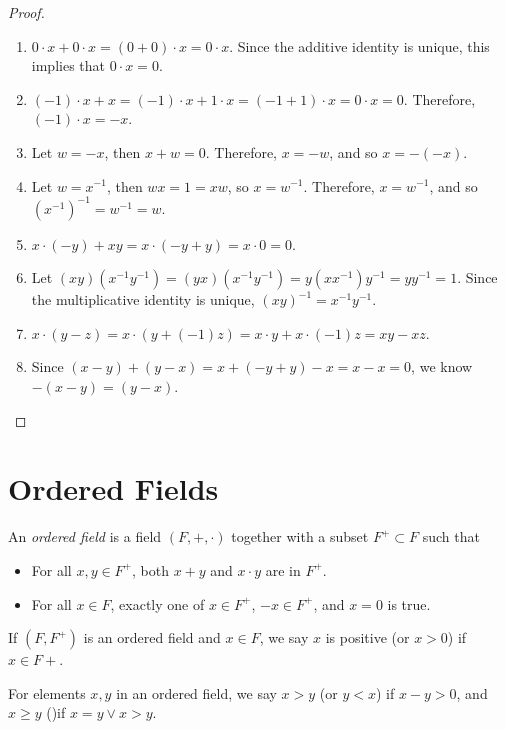 \documentclass[12pt]{article}
\begin{document}
\begin{proof}\proofbreak
    \begin{enumerate}
        \item $0 \cdot x + 0 \cdot x = (0 + 0) \cdot x = 0 \cdot x$. Since the additive identity is unique, this implies that $0 \cdot x = 0$.
        \item $(-1) \cdot x + x = (-1) \cdot x + 1 \cdot x = (-1 + 1) \cdot x = 0 \cdot x = 0$. Therefore, $(-1) \cdot x = -x$.
        \item Let $w = -x$, then $x + w = 0$. Therefore, $x = -w$, and so $x = -(-x)$.
        \item Let $w = x^{-1}$, then $wx = 1 = xw$, so $x = w^{-1}$. Therefore, $x = w^{-1}$, and so $(x^{-1})^{-1} = w^{-1} = w$.
        \item $x \cdot (-y) + xy = x\cdot(-y + y) = x\cdot 0 = 0$.
        \item Let $(xy)(x^{-1}y^{-1}) = (yx)(x^{-1}y^{-1}) = y(xx^{-1})y^{-1} = yy^{-1} = 1$. Since the multiplicative identity is unique, $(xy)^{-1} = x^{-1}y^{-1}$.
        \item $x \cdot (y-z) = x \cdot (y + (-1)z) = x\cdot y + x \cdot (-1)z = xy - xz$.
        \item Since $(x - y) + (y-x) = x + (-y + y) - x = x - x = 0$, we know $-(x - y) = (y - x)$.
    \end{enumerate}
\end{proof}

\section{Ordered Fields}

\begin{defn}
    An \emph{ordered field} is a field $(F, +, \cdot)$ together with a subset $F^+ \subset F$ such that\begin{itemize}
        \item For all $x, y \in F^+$, both $x + y$ and $x \cdot y$ are in $F^+$.
        \item For all $x \in F$, exactly one of $x \in F^+$, $-x \in F^+$, and $x = 0$ is true.
    \end{itemize}
\end{defn}

If $(F, F^+)$ is an ordered field and $x \in F$, we say $x$ is positive (or $x > 0$) if $x \in F+$.

\begin{defn}
    For elements $x, y$ in an ordered field, we say $x > y$ (or $y < x$) if $x - y > 0$, and $x \geq y$  ()if $x = y \lor x > y$.
\end{defn}
\end{document}
